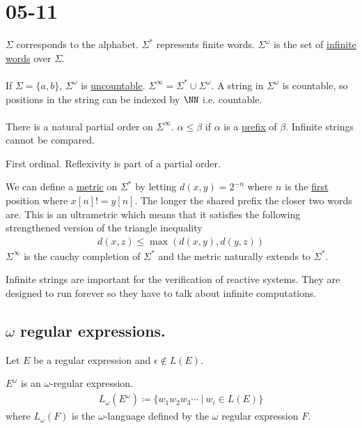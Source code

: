 \documentclass[../598comp.tex]{subfiles}
\date{05-11}
\begin{document}
\section{05-11}

$\Sigma$ corresponds to the alphabet. $\Sigma^*$ represents finite words.
$\Sigma^\omega$ is the set of \ul{infinite words} over $\Sigma$.
\\\\
If $\Sigma = \{a, b\}$, $\Sigma^\omega$ is \ul{uncountable}. $\Sigma^\infty =
\Sigma^* \cup \Sigma^\omega$. A string in $\Sigma^\omega$ is countable, so positions in
the string can be indexed by $\NN$ i.e. countable.
\\\\
There is a natural partial order on $\Sigma^\infty$. $\alpha \leq \beta$ if $\alpha$
is a \ul{prefix} of $\beta$. Infinite strings cannot be compared.

First ordinal. Reflexivity is part of a partial order.

\begin{remark}
  We can define a \ul{metric} on $\Sigma^*$ by letting $d(x, y) = 2^{-n}$ where
  $n$ is the \ul{first} position where $x[n] != y[n]$. The longer the shared
  prefix the closer two words are. This is an ultrametric which means that it
  satisfies the following strengthened version of the triangle inequality
  \begin{gather*}
    d(x, z) \leq \max (d(x, y), d(y, z))
  \end{gather*}
  $\Sigma^\infty$ is the cauchy completion of $\Sigma^*$ and the metric
  naturally extends to $\Sigma^*$.
\end{remark}

Infinite strings are important for the verification of reactive systems. They
are designed to run forever so they have to talk about infinite computations.

\subsection{$\omega$ regular expressions.}

Let $E$ be a regular expression and $\epsilon \notin L(E)$.

$E^\omega$ is an $\omega$-regular expression.
\begin{gather*}
  L_\omega(E^\omega) \coloneqq \{w_1w_2w_3\cdots \ | \ w_i \in L(E)\}
\end{gather*}
where $L_\omega(F)$ is the $\omega$-language defined by the $\omega$ regular
expression $F$.
\end{document}
